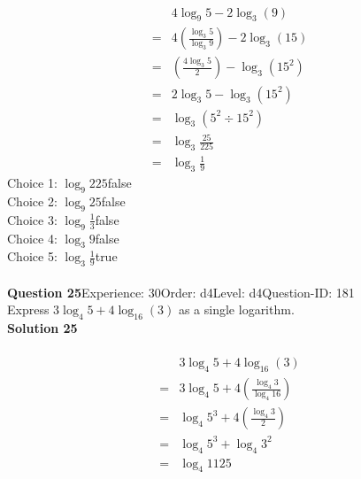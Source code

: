 \documentclass{article}
\begin{document}
\\[-35pt]\begin{align*}
&4\log_{9}5-2\log_{3}(9)\\[2pt]
=&4\left(\displaystyle\frac{\log_{3}5}{\log_{3}9}\right)-2\log_{3}(15)\\[2pt]
=&\left(\displaystyle\frac{4\log_{3}5}{2}\right)-\log_{3}(15^2)\\[2pt]
=&2\log_{3}5-\log_{3}(15^2)\\[2pt]
=&\log_{3}(5^2 \div 15^2)\\[2pt]
=&\log_{3}\displaystyle\frac{25}{225}\\[2pt]
=&\log_{3}\displaystyle\frac{1}{9}
\end{align*}
Choice 1: \hspace{20pt}$\log_{9}225$\hspace{20pt}false\\
Choice 2: \hspace{20pt}$\log_{9}25$\hspace{20pt}false\\
Choice 3: \hspace{20pt}$\log_{9}\displaystyle\frac{1}{3}$\hspace{20pt}false\\
Choice 4: \hspace{20pt}$\log_{3}9$\hspace{20pt}false\\
Choice 5: \hspace{20pt}$\log_{3}\displaystyle\frac{1}{9}$\hspace{20pt}true\\
\\[4pt]
\noindent\textbf{Question 25}\hspace{20pt}Experience: 30\hspace{20pt}Order: d4\hspace{20pt}Level: d4\hspace{20pt}Question-ID: 181\\[2pt]
Express $3\log_{4}5+4\log_{16}(3)$ as a single logarithm.\\[4pt]
\noindent\textbf{Solution 25}\\[2pt]
\\[-35pt]\begin{align*}
&3\log_{4}5+4\log_{16}(3)\\[2pt]
=&3\log_{4}5+4\left(\displaystyle\frac{\log_{4}3}{\log_{4}16}\right)\\[2pt]
=&\log_{4}5^3+4\left(\displaystyle\frac{\log_{4}3}{2}\right)\\[2pt]
=&\log_{4}5^3+\log_{4}3^2\\[2pt]
=&\log_{4}1125\\[-120pt]
\end{align*}
\end{document}
